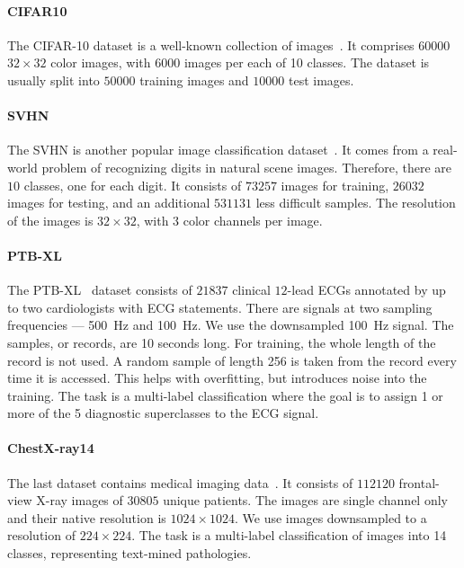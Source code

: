 \paragraph{CIFAR10}
The CIFAR-10 dataset is a well-known collection of images~\cite{krizhevsky2009learning}. It comprises $60000$ $32\times 32$ color images, with $6000$ images per each of 10 classes. The dataset is usually split into $50000$ training images and $10000$ test images. %

\paragraph{SVHN}
The SVHN is another popular image classification dataset~\cite{netzer2011reading}. It comes from a real-world problem of recognizing digits in natural scene images. Therefore, there are $10$ classes, one for each digit. It consists of $73257$ images for training, $26032$ images for testing, and an additional $531131$ less difficult samples. The resolution of the images is $32\times 32$, with $3$ color channels per image.

\paragraph{PTB-XL}
 The PTB-XL~\cite{wagner2020ptb} dataset consists of $21837$ clinical $12$-lead ECGs annotated by up to two cardiologists with ECG statements. There are signals at two sampling frequencies --- \SI{500}{\hertz} and \SI{100}{\hertz}. We use the downsampled \SI{100}{\hertz} signal. The samples, or records, are 10 seconds long. For training, the whole length of the record is not used. A random sample of length 256 is taken from the record every time it is accessed. This helps with overfitting, but introduces noise into the training. The task is a multi-label classification where the goal is to assign 1 or more of the 5 diagnostic superclasses to the ECG signal.

\paragraph{ChestX-ray14}
The last dataset contains medical imaging data~\cite{wang2017chestx}. It consists of $112120$ frontal-view X-ray images of $30805$ unique patients. The images are single channel only and their native resolution is $1024\times 1024$. We use images downsampled to a resolution of $224\times 224$. The task is a multi-label classification of images into 14 classes, representing text-mined pathologies.


